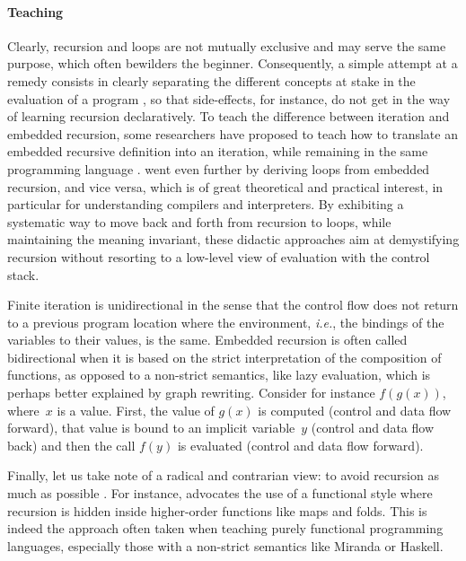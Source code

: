 \documentclass[11pt,a4paper]{article}
\newcommand\plang[1]{\textsf{#1}\xspace}
\begin{document}
\paragraph{Teaching}

Clearly, recursion and loops are not mutually exclusive and may serve
the same purpose, which often bewilders the beginner. Consequently, a
simple attempt at a remedy consists in clearly separating the
different concepts at stake in the evaluation of a program
\citep{Velazquez:2000}, so that side\hyp{}effects, for instance, do
not get in the way of learning recursion declaratively. To teach the
difference between iteration and embedded recursion, some researchers
have proposed to teach how to translate an embedded recursive
definition into an iteration, while remaining in the same programming
language
\citep{AugensteinTenenbaum:1976,RubioVelazquez:2009,Rubio:2010,Rinderknecht:2012}. \textcite{Foltynowicz:2007}
went even further by deriving loops from embedded recursion, and vice
versa, which is of great theoretical and practical interest, in
particular for understanding compilers and interpreters. By exhibiting
a systematic way to move back and forth from recursion to loops, while
maintaining the meaning invariant, these didactic approaches aim at
demystifying recursion without resorting to a low\hyp{}level view of
evaluation with the control stack.

Finite iteration is unidirectional in the sense that the control flow
does not return to a previous program location where the environment,
\emph{i.e.}, the bindings of the variables to their values, is the
same. Embedded recursion is often called bidirectional when it is
based on the strict interpretation of the composition of functions, as
opposed to a non\hyp{}strict semantics, like lazy evaluation, which is
perhaps better explained by graph rewriting. Consider for instance
\(f(g(x))\), where~\(x\) is a value. First, the value of \(g(x)\) is
computed (control and data flow forward), that value is bound to an
implicit variable~\(y\) (control and data flow back) and then the call
\(f(y)\) is evaluated (control and data flow forward).

Finally, let us take note of a radical and contrarian view: to avoid
recursion as much as possible
\citep{Anonymous:1977,BunemanLevy:1980}. For instance,
\textcite{Harvey:1992} advocates the use of a functional style where
recursion is hidden inside higher\hyp{}order functions like maps and
folds. This is indeed the approach often taken when teaching purely
functional programming languages, especially those with a non-strict
semantics like \plang{Miranda} or \plang{Haskell}.
\end{document}
